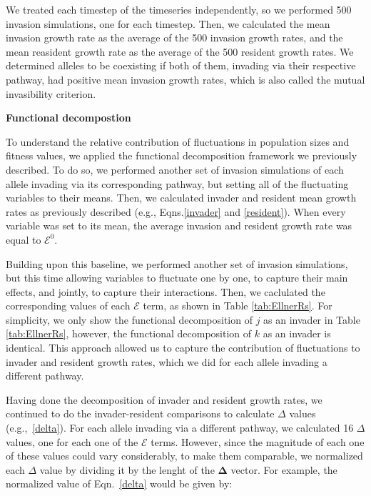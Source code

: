 \documentclass[]{article}
\begin{document}
We treated each timestep of the timeseries independently, so we performed 500 invasion simulations, one for each timestep. Then, we calculated the mean invasion growth rate as the average of the 500 invasion growth rates, and the mean reasident growth rate as the average of the 500 resident growth rates. We determined alleles to be coexisting if both of them, invading via their respective pathway, had positive  mean invasion growth rates, which is also called the mutual invasibility criterion.

\vspace{5mm}
\noindent\textbf{Functional decompostion}

To understand the relative contribution of fluctuations in population sizes and fitness values, we applied the functional decomposition framework we previously described. To do so, we performed another set of invasion simulations of each allele invading via its corresponding pathway, but setting all of the  fluctuating variables to their means. Then, we calculated invader and resident mean growth rates as previously described (e.g., Eqns.\ref{invader} and \ref{resident}). When every variable was set to its mean, the average invasion and resident growth rate was equal to $\mathcal{E}^{0}$.

Building upon this baseline, we performed another set of invasion simulations, but this time allowing variables to fluctuate one by one, to capture their main effects, and jointly, to capture their interactions. Then, we  caclulated the corresponding values of each $\mathcal{E}$ term, as shown in Table \ref{tab:EllnerRs}. For simplicity, we only show the functional decomposition of $j$ as an invader in Table \ref{tab:EllnerRs}, however, the functional decomposition of $k$ as an invader is identical.  This approach allowed us to capture the contribution of fluctuations to invader and resident growth rates, which we did for each allele invading a different pathway.

Having done the decomposition of invader and resident growth rates, we continued to do the invader-resident comparisons to calculate $\Delta$ values (e.g.,~\ref{delta}). For each allele invading via a different pathway, we calculated 16 $\Delta$ values, one for each one of the $\mathcal{E}$ terms. However, since the magnitude of each one of these values could vary considerably, to make them comparable, we normalized each $\Delta$ value by dividing it by the lenght of the $\boldsymbol{\Delta}$ vector. For example, the normalized value of Eqn.~\ref{delta} would be given by:
\end{document}
